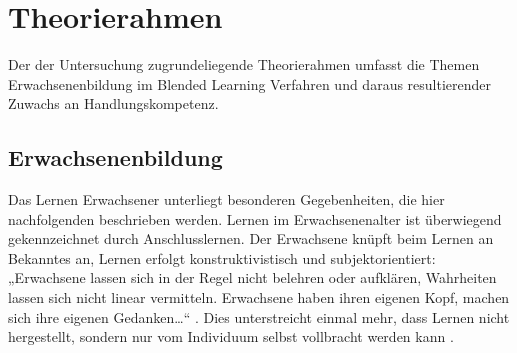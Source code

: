 \documentclass[12pt,smallheadings, bibliography=totoc]{scrartcl}
\begin{document}
\section{Theorierahmen}\label{theorierahmen}

Der der Untersuchung zugrundeliegende Theorierahmen umfasst die Themen
Erwachsenenbildung im Blended Learning Verfahren und daraus
resultierender Zuwachs an Handlungskompetenz.

\subsection{Erwachsenenbildung}\label{erwachsenenbildung}

Das Lernen Erwachsener unterliegt besonderen Gegebenheiten, die hier
nachfolgenden beschrieben werden. Lernen im Erwachsenenalter ist
überwiegend gekennzeichnet durch Anschlusslernen. Der Erwachsene knüpft
beim Lernen an Bekanntes an, Lernen erfolgt konstruktivistisch und
subjektorientiert: „Erwachsene lassen sich in der Regel nicht belehren
oder aufklären, Wahrheiten lassen sich nicht linear vermitteln.
Erwachsene haben ihren eigenen Kopf, machen sich ihre eigenen
Gedanken\ldots`` \parencite[15]{Siebert201408}. Dies unterstreicht
einmal mehr, dass Lernen nicht hergestellt, sondern nur vom Individuum
selbst vollbracht werden kann \parencite{Faulstich2012}.
\end{document}
